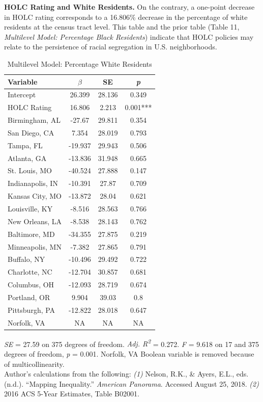 \documentclass[paper=letter, fontsize=12pt]{scrartcl} %
\begin{document}
\begin{table}
	\textbf{HOLC Rating and White Residents.} On the contrary, a one-point decrease in HOLC rating corresponds to a 16.806\% decrease in the percentage of white residents at the census tract level. This table and the prior table (Table 11, \textit{Multilevel Model: Percentage Black Residents}) indicate that HOLC policies may relate to the persistence of racial segregation in U.S. neighborhoods.
	\caption{Multilevel Model: Percentage White Residents}
	\begin{center}
		\begin{tabular}{|| l | c c c ||}
			\hline
			Variable & $\beta$ & SE & \textit{p}\\
			\hline \hline
			Intercept & 26.399 & 28.136 & 0.349\\ 
			\hline 
			HOLC Rating & 16.806 & 2.213 & 0.001***\\ 
			\hline 
			Birmingham, AL & -27.67 & 29.811 & 0.354\\ 
			\hline 
			San Diego, CA & 7.354 & 28.019 & 0.793\\ 
			\hline 
			Tampa, FL & -19.937 & 29.943 & 0.506\\ 
			\hline 
			Atlanta, GA & -13.836 & 31.948 & 0.665\\ 
			\hline 
			St. Louis, MO & -40.524 & 27.888 & 0.147\\ 
			\hline 
			Indianapolis, IN & -10.391 & 27.87 & 0.709\\ 
			\hline 
			Kansas City, MO & -13.872 & 28.04 & 0.621\\ 
			\hline 
			Louisville, KY & -8.516 & 28.563 & 0.766\\ 
			\hline 
			New Orleans, LA & -8.538 & 28.143 & 0.762\\ 
			\hline 
			Baltimore, MD & -34.355 & 27.875 & 0.219\\ 
			\hline 
			Minneapolis, MN & -7.382 & 27.865 & 0.791\\ 
			\hline 
			Buffalo, NY & -10.496 & 29.492 & 0.722\\ 
			\hline 
			Charlotte, NC & -12.704 & 30.857 & 0.681\\ 
			\hline 
			Columbus, OH & -12.093 & 28.719 & 0.674\\ 
			\hline 
			Portland, OR & 9.904 & 39.03 & 0.8\\ 
			\hline 
			Pittsburgh, PA & -12.822 & 28.018 & 0.647\\ 
			\hline 
			Norfolk, VA & NA & NA & NA\\  
			\hline
		\end{tabular}
	\end{center}
\textit{SE} = 27.59 on 375 degrees of freedom. \textit{Adj. R\textsuperscript{2}} = 0.272. \textit{F} = 9.618 on 17 and 375 degrees of freedom, \textit{p} = 0.001. Norfolk, VA Boolean variable is removed because of multicollinearity.\\
Author's calculations from the following: \textit{(1)} Nelson, R.K., \& Ayers, E.L., eds. (n.d.). ``Mapping Inequality.'' \textit{American Panorama}. Accessed August 25, 2018. \textit{(2)} 2016 ACS 5-Year Estimates, Table B02001.
\end{table}
\end{document}
